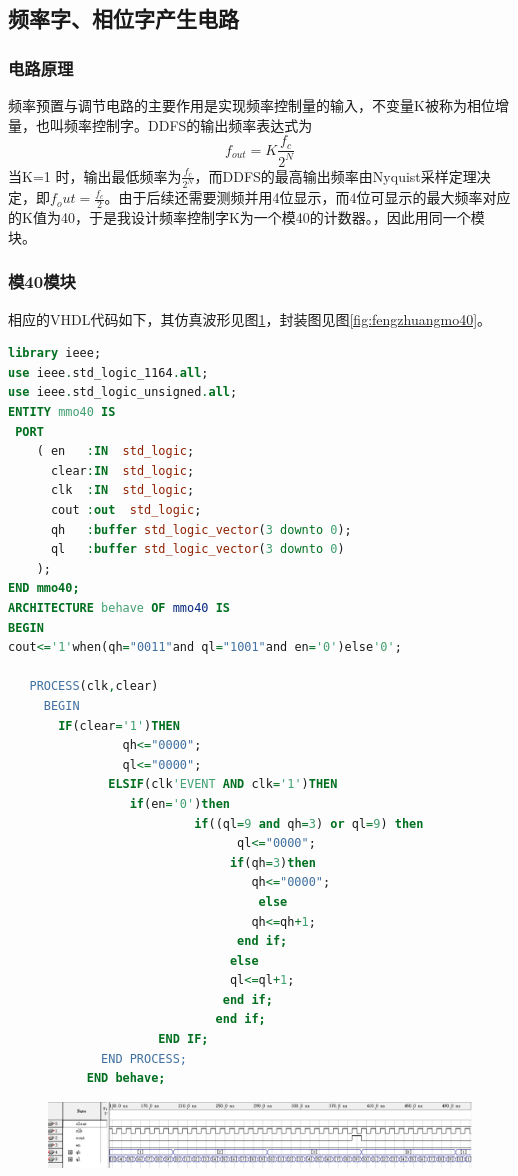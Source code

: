 \documentclass[12pt]{article}
\begin{document}
\subsection{频率字、相位字产生电路}
\subsubsection{电路原理}
频率预置与调节电路的主要作用是实现频率控制量的输入，不变量K被称为相位增量，也叫频率控制字。DDFS的输出频率表达式为$$f_{out}=K\frac{f_c}{2^N}$$当K=1 时，输出最低频率为$\frac{f_c}{2^N}$，而DDFS的最高输出频率由Nyquist采样定理决定，即$f_out=\frac{f_c}{2}$。由于后续还需要测频并用4位显示，而4位可显示的最大频率对应的K值为40，于是我设计频率控制字K为一个模40的计数器。，因此用同一个模块。
\subsubsection{模40模块}
相应的VHDL代码如下，其仿真波形见图\ref{fig:fangzhenmo40}，封装图见图\ref{fig:fengzhuangmo40}。
\begin{lstlisting}[language=VHDL]
library ieee;
use ieee.std_logic_1164.all;
use ieee.std_logic_unsigned.all;
ENTITY mmo40 IS 
 PORT
    ( en   :IN  std_logic;
      clear:IN  std_logic;
      clk  :IN  std_logic;
      cout :out  std_logic;
      qh   :buffer std_logic_vector(3 downto 0);
      ql   :buffer std_logic_vector(3 downto 0)
    );
END mmo40;
ARCHITECTURE behave OF mmo40 IS
BEGIN
cout<='1'when(qh="0011"and ql="1001"and en='0')else'0'; 

   PROCESS(clk,clear)
     BEGIN
       IF(clear='1')THEN
                qh<="0000";
                ql<="0000";
              ELSIF(clk'EVENT AND clk='1')THEN
                 if(en='0')then
                          if((ql=9 and qh=3) or ql=9) then
                                ql<="0000";
                               if(qh=3)then
                                  qh<="0000";
                                   else
                                  qh<=qh+1;
                                end if;
                               else
                               ql<=ql+1;
                              end if;
                             end if;
                     END IF;
             END PROCESS;
           END behave;

\end{lstlisting}
\begin{figure}[hp]
	\centering  
	\includegraphics[width=\textwidth]{picture/mo40box.png} 
	\caption{}
	\label{fig:fangzhenmo40}   
\end{figure}
\end{document}
